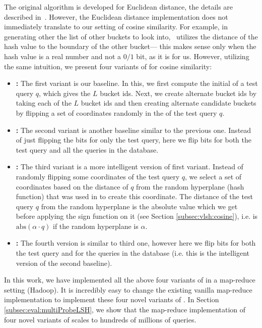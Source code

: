 The original \mblshf algorithm is developed for Euclidean distance, the details
are described in~\cite{LvVLDB07}. However, the Euclidean distance implementation does not immediately translate to our setting of cosine similarity. 
For example, in generating other the list of other buckets to look into,~\cite{LvVLDB07} utilizes the distance of the hash value 
to the boundary of the other bucket--- this
makes sense only when the hash value is a real number and not a $0/1$ bit, as it is for us. 
However, utilizing the same intuition, we present four variants  
of \mblshf for cosine similarity:
\begin{itemize}
\item {\bf \rflipq:} The first variant is our baseline. In this, we first compute the initial \lsh of a test query $q$, which gives the $L$ bucket ids.  
Next, we create alternate bucket ids by taking each of the $L$ bucket ids and then creating alternate candidate buckets by flipping a 
set of coordinates randomly in the \lsh of the test query $q$.  
\item {\bf \rflipb:} The second variant is another baseline similar to the previous one. Instead of just flipping the bits for only the test query, 
here we flip bits for both the test query and all the queries in the database. 
\item {\bf \dflipq:} The third variant is a more intelligent version of first variant. Instead of randomly flipping some coordinates
of the test query $q$, 
we select a set of coordinates based on the distance of $q$ from the random hyperplane (hash function) 
that was used in to create this coordinate. 
The distance of the test query $q$ from the random hyperplane is the absolute value which we get before applying the sign function on it 
(see Section \ref{subsec:vlsh:cosine}), i.e. is $ \mathrm{abs}(\alpha \cdot q)$ if the random hyperplane is $\alpha$. 
\item {\bf \dflipb:} The fourth version is similar to third one, however 
here we flip bits for both the test query and for the queries in the database (i.e. this is the intelligent version of the second baseline). 
\end{itemize}

In this work, we have implemented all the above four variants of \lsh in a map-reduce setting (Hadoop). 
It is incredibly easy to change the existing vanilla \lsh map-reduce implementation to implement 
these four novel variants of \lsh.  
In Section \ref{subsec:eval:multiProbeLSH}, we show that the map-reduce implementation of four novel variants of \lsh scales to hundreds of millions of queries.  


